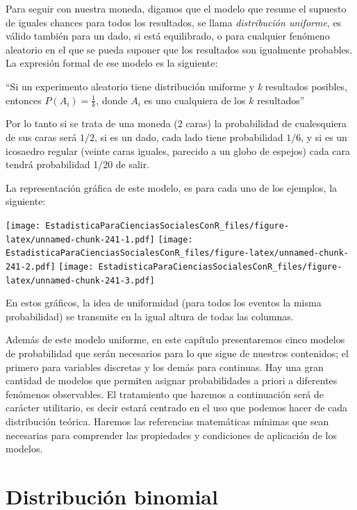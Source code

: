 \documentclass[]{book}
\begin{document}
Para seguir con nuestra moneda, digamos que el modelo que resume el
supuesto de iguales chances para todos los resultados, se llama
\emph{distribución uniforme}, es válido también para un dado, si está
equilibrado, o para cualquier fenómeno aleatorio en el que se pueda
suponer que los resultados son igualmente probables. La expresión formal
de ese modelo es la siguiente:

``Si un experimento aleatorio tiene distribución uniforme y \emph{k}
resultados posibles, entonces \(P(A_{i}) = \frac{1}{k}\),
donde \(A_{i}\) es uno cualquiera de los \(k\) resultados''

Por lo tanto si se trata de una moneda (2 caras) la probabilidad de
cualesquiera de sus caras será \(1/2\), si es un dado, cada lado tiene
probabilidad \(1/6\), y si es un icosaedro regular (veinte caras iguales,
parecido a un globo de espejos) cada cara tendrá probabilidad 1/20 de
salir.

La representación gráfica de este modelo, es para cada uno de los
ejemplos, la siguiente:

\texttt{[image: EstadisticaParaCienciasSocialesConR\_files/figure-latex/unnamed-chunk-241-1.pdf]} \texttt{[image: EstadisticaParaCienciasSocialesConR\_files/figure-latex/unnamed-chunk-241-2.pdf]} \texttt{[image: EstadisticaParaCienciasSocialesConR\_files/figure-latex/unnamed-chunk-241-3.pdf]}

En estos gráficos, la idea de uniformidad (para todos los eventos la
misma probabilidad) se transmite en la igual altura de todas las
columnas.

Además de este modelo uniforme, en este capítulo presentaremos cinco
modelos de probabilidad que serán necesarios para lo que sigue de
nuestros contenidos; el primero para variables discretas y los demás
para continuas. Hay una gran cantidad de modelos que permiten asignar
probabilidades a priori a diferentes fenómenos observables. El
tratamiento que haremos a continuación será de carácter utilitario, es
decir estará centrado en el uso que podemos hacer de cada distribución
teórica. Haremos las referencias matemáticas mínimas que sean necesarias
para comprender las propiedades y condiciones de aplicación de los
modelos.

\hypertarget{distribuciuxf3n-binomial}{%
\section{Distribución binomial}\label{distribuciuxf3n-binomial}}
\end{document}
